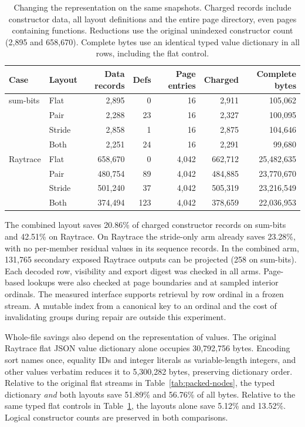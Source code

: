 \begin{table}[ht]
\centering\small
\caption{Changing the representation on the same snapshots. Charged records include constructor data, all layout definitions and the entire page directory, even pages containing functions. Reductions use the original unindexed constructor count (2,895 and 658,670). Complete bytes use an identical typed value dictionary in all rows, including the flat control.}
\label{tab:projected-layouts}
\begin{tabular}{llrrrrr}
\toprule
Case & Layout & Data records & Defs & Page entries & Charged & Complete bytes\\
\midrule
sum-bits & Flat   & 2,895 & 0  & 16 & 2,911 & 105,062\\
         & Pair   & 2,288 & 23 & 16 & 2,327 & 100,095\\
         & Stride & 2,858 & 1  & 16 & 2,875 & 104,646\\
         & Both   & 2,251 & 24 & 16 & 2,291 & 99,680\\
\midrule
Raytrace & Flat   & 658,670 & 0   & 4,042 & 662,712 & 25,482,635\\
         & Pair   & 480,754 & 89  & 4,042 & 484,885 & 23,770,670\\
         & Stride & 501,240 & 37  & 4,042 & 505,319 & 23,216,549\\
         & Both   & 374,494 & 123 & 4,042 & 378,659 & 22,036,953\\
\bottomrule
\end{tabular}
\end{table}

The combined layout saves 20.86\% of charged constructor records on sum-bits and 42.51\% on Raytrace. On Raytrace the stride-only arm already saves 23.28\%, with no per-member residual values in its sequence records. In the combined arm, 131,765 secondary exposed Raytrace outputs can be projected (258 on sum-bits). Each decoded row, visibility and export digest was checked in all arms. Page-based lookups were also checked at page boundaries and at sampled interior ordinals. The measured interface supports retrieval by row ordinal in a frozen stream. A mutable index from a canonical key to an ordinal and the cost of invalidating groups during repair are outside this experiment.

Whole-file savings also depend on the representation of values. The original Raytrace flat JSON value dictionary alone occupies 30,792,756 bytes. Encoding sort names once, equality IDs and integer literals as variable-length integers, and other values verbatim reduces it to 5,300,282 bytes, preserving dictionary order. Relative to the original flat streams in Table~\ref{tab:packed-nodes}, the typed dictionary \emph{and} both layouts save 51.89\% and 56.76\% of all bytes. Relative to the same typed flat controls in Table~\ref{tab:projected-layouts}, the layouts alone save 5.12\% and 13.52\%. Logical constructor counts are preserved in both comparisons.

